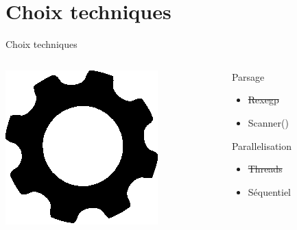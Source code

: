\documentclass[xcolor=x11names,12pt,compress]{beamer}
\begin{document}
\section{Choix techniques}
\begin{frame}{Choix techniques}
    \begin{columns}
        \begin{column}{0.3\textwidth}
            \includegraphics{gear.eps}
        \end{column}
        \begin{column}{0.7\textwidth}
            \begin{block}{Parsage}
                \begin{itemize}
                    \item \st{Rexegp}
                    \item Scanner()
                \end{itemize}
            \end{block}
            \pause
            \begin{block}{Parallelisation}
                \begin{itemize}
                    \item \st{Threads}
                    \item Séquentiel
                \end{itemize}
            \end{block}
        \end{column}
    \end{columns}
\end{frame}
\end{document}
